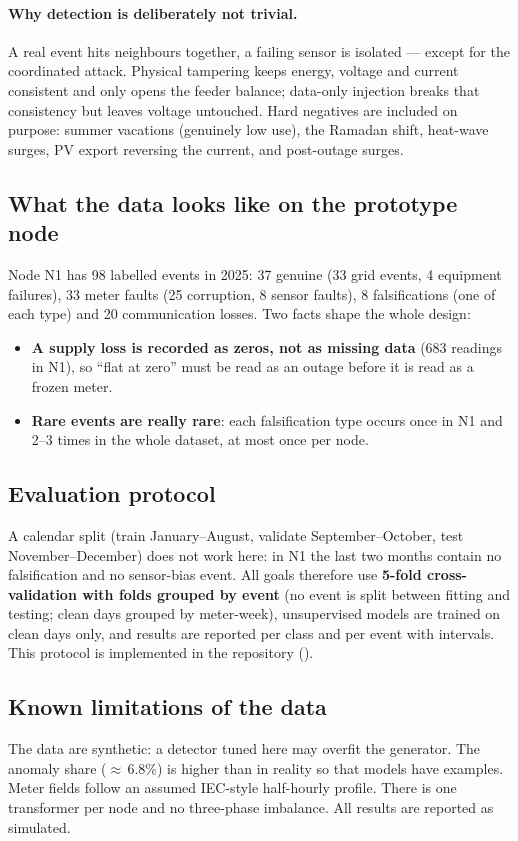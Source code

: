 \paragraph{Why detection is deliberately not trivial.} A real event hits neighbours together, a failing sensor
is isolated --- except for the coordinated attack. Physical tampering keeps energy, voltage and current
consistent and only opens the feeder balance; data-only injection breaks that consistency but leaves voltage
untouched. Hard negatives are included on purpose: summer vacations (genuinely low use), the Ramadan shift,
heat-wave surges, PV export reversing the current, and post-outage surges.

\subsection{What the data looks like on the prototype node}
Node N1 has 98 labelled events in 2025: 37 genuine (33 grid events, 4 equipment failures), 33 meter faults (25
corruption, 8 sensor faults), 8 falsifications (one of each type) and 20 communication losses. Two facts shape
the whole design:
\begin{itemize}
  \item \textbf{A supply loss is recorded as zeros, not as missing data} (683 readings in N1), so ``flat at
        zero'' must be read as an outage before it is read as a frozen meter.
  \item \textbf{Rare events are really rare}: each falsification type occurs once in N1 and 2--3 times in the
        whole dataset, at most once per node.
\end{itemize}

\subsection{Evaluation protocol}
A calendar split (train January--August, validate September--October, test November--December) does not work
here: in N1 the last two months contain no falsification and no sensor-bias event. All goals therefore use
\textbf{5-fold cross-validation with folds grouped by event} (no event is split between fitting and testing;
clean days grouped by meter-week), unsupervised models are trained on clean days only, and results are reported
per class and per event with intervals. This protocol is implemented in the repository
().

\subsection{Known limitations of the data}
The data are synthetic: a detector tuned here may overfit the generator. The anomaly share ($\approx$\,6.8\%) is
higher than in reality so that models have examples. Meter fields follow an assumed IEC-style half-hourly
profile. There is one transformer per node and no three-phase imbalance. All results are reported as simulated.

